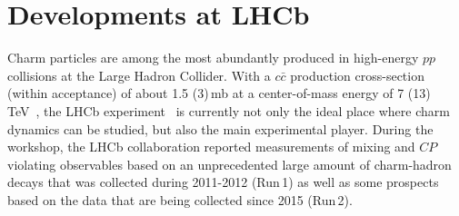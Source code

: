 \documentclass{PoS}
\newcommand{\CP}{{\ensuremath{C\!P}}\xspace}
\begin{document}
\section{Developments at LHCb}
\label{sec:LHCb}
%

Charm particles are among the most abundantly produced in high-energy $pp$ collisions at the Large Hadron Collider. With a $c\bar{c}$ production cross-section (within acceptance) of about 1.5 (3)\,mb at a center-of-mass energy of 7 (13) TeV~\cite{LHCb-PAPER-2012-041,LHCb-PAPER-2015-041}, the LHCb experiment~\cite{Alves:2008zz} is currently not only the ideal place where charm dynamics can be studied, but also the main experimental player.  During the workshop, the LHCb collaboration reported measurements of mixing and \CP violating observables based on an unprecedented large amount of charm-hadron decays that was collected during 2011-2012 (Run\,1) as well as some prospects based on the data that are being collected since 2015 (Run\,2).
\end{document}
